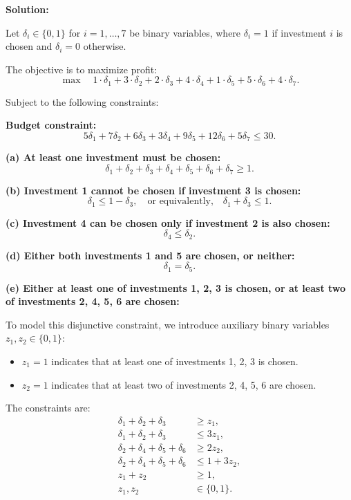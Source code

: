 \documentclass{article}
\begin{document}
\begin{enumerate}
\textbf{Solution:}

Let $\delta_i \in \{0,1\}$ for $i = 1, \ldots, 7$ be binary variables, where $\delta_i = 1$ if investment $i$ is chosen and $\delta_i = 0$ otherwise.

The objective is to maximize profit:
\[
\max \quad 1 \cdot \delta_1 + 3 \cdot \delta_2 + 2 \cdot \delta_3 + 4 \cdot \delta_4 + 1 \cdot \delta_5 + 5 \cdot \delta_6 + 4 \cdot \delta_7.
\]

Subject to the following constraints:

\textbf{Budget constraint:}
\[
5\delta_1 + 7\delta_2 + 6\delta_3 + 3\delta_4 + 9\delta_5 + 12\delta_6 + 5\delta_7 \leq 30.
\]

\textbf{(a) At least one investment must be chosen:}
\[
\delta_1 + \delta_2 + \delta_3 + \delta_4 + \delta_5 + \delta_6 + \delta_7 \geq 1.
\]

\textbf{(b) Investment 1 cannot be chosen if investment 3 is chosen:}
\[
\delta_1 \leq 1 - \delta_3, \quad \text{or equivalently,} \quad \delta_1 + \delta_3 \leq 1.
\]

\textbf{(c) Investment 4 can be chosen only if investment 2 is also chosen:}
\[
\delta_4 \leq \delta_2.
\]

\textbf{(d) Either both investments 1 and 5 are chosen, or neither:}
\[
\delta_1 = \delta_5.
\]

\textbf{(e) Either at least one of investments 1, 2, 3 is chosen, or at least two of investments 2, 4, 5, 6 are chosen:}

To model this disjunctive constraint, we introduce auxiliary binary variables $z_1, z_2 \in \{0,1\}$:
\begin{itemize}
    \item $z_1 = 1$ indicates that at least one of investments 1, 2, 3 is chosen.
    \item $z_2 = 1$ indicates that at least two of investments 2, 4, 5, 6 are chosen.
\end{itemize}

The constraints are:
\begin{align*}
    \delta_1 + \delta_2 + \delta_3 &\geq z_1, \\
    \delta_1 + \delta_2 + \delta_3 &\leq 3z_1, \\
    \delta_2 + \delta_4 + \delta_5 + \delta_6 &\geq 2z_2, \\
    \delta_2 + \delta_4 + \delta_5 + \delta_6 &\leq 1 + 3z_2, \\
    z_1 + z_2 &\geq 1, \\
    z_1, z_2 &\in \{0,1\}.
\end{align*}


\end{enumerate}
\end{document}
